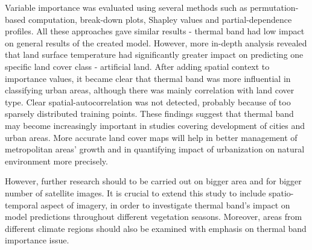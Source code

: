 \documentclass{amuthesis}
\begin{document}
Variable importance was evaluated using several methods such as
permutation-based computation, break-down plots, Shapley values and
partial-dependence profiles. All these approaches gave similar results -
thermal band had low impact on general results of the created model.
However, more in-depth analysis revealed that land surface temperature
had significantly greater impact on predicting one specific land cover
class - artificial land. After adding spatial context to importance
values, it became clear that thermal band was more influential in
classifying urban areas, although there was mainly correlation with land
cover type. Clear spatial-autocorrelation was not detected, probably
because of too sparsely distributed training points. These findings
suggest that thermal band may become increasingly important in studies
covering development of cities and urban areas. More accurate land cover
maps will help in better management of metropolitan areas' growth and in
quantifying impact of urbanization on natural environment more
precisely.

However, further research should to be carried out on bigger area and
for bigger number of satellite images. It is crucial to extend this
study to include spatio-temporal aspect of imagery, in order to
investigate thermal band's impact on model predictions throughout
different vegetation seasons. Moreover, areas from different climate
regions should also be examined with emphasis on thermal band importance
issue.

\printbibliography[heading=bibintoc, title=Bibliography]
\end{document}
